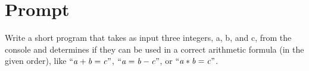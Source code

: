 \documentclass[11pt]{article}
\begin{document}
    \section{Prompt}\label{sec:prompt}

Write a short program that takes as input three integers,
a, b, and c, from the console and determines if they can be
used in a correct arithmetic formula (in the given order), like
$``\mathit{a} + \mathit{b} = \mathit{c}"$,
$``\mathit{a} = \mathit{b} - \mathit{c}"$,
or $``\mathit{a} * \mathit{b} = \mathit{c}"$.
\end{document}
